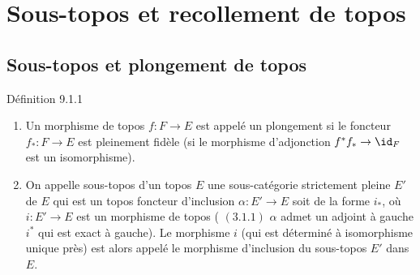 \documentclass[10pt]{../fichiers-configuration-latex/smfart}
\begin{document}
\section{Sous-topos et recollement de
  topos}\pageoriginale

\subsection{Sous-topos et plongement de
  topos}

\begin{enonce*}{Définition 9.1.1}
\begin{enumerate}
\renewcommand{\theenumi}{\alph{enumi}}
\renewcommand{\labelenumi}{\theenumi)}
\item Un morphisme de topos $f:F\rightarrow E$ est appelé un
plongement si le foncteur $f_{\ast}:F\rightarrow E$ est pleinement
fidèle (\ie si le morphisme d'adjonction
$f^{\ast}f_{\ast}\rightarrow \id_F$ est un isomorphisme).

\item On appelle sous-topos d'un topos $E$ une sous-catégorie
strictement pleine $E'$ de $E$ qui est un topos 
foncteur d'inclusion $\alpha:E'\rightarrow E$ soit de la forme
$i_{\ast}$, où $i:E'\rightarrow E$ est un morphisme de topos (\ie
$(\hyperref[IV.subsubsec3.1.1]{3.1.1})$ $\alpha$ admet un adjoint à gauche
$i^{\ast}$ qui est exact à gauche). Le morphisme $i$ (qui est
déterminé à isomorphisme unique près) est alors appelé
le morphisme
d'inclusion du sous-topos $E'$ dans $E$.
\end{enumerate}
\end{enonce*}
\end{document}
